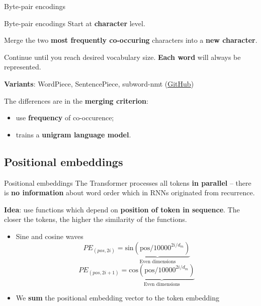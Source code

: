 \documentclass[12pt,aspectratio=169,handout]{beamer}
\begin{document}
\begin{frame}{Byte-pair encodings}

	\begin{block}{Byte-pair encodings}
		Start at \textbf{character} level. 
		
		Merge the two \textbf{most frequently co-occuring} characters into a \textbf{new character}. 
		
		Continue until you reach desired vocabulary size.
		\textbf{Each word} will always be represented.

	\end{block}

	\pause

	\textbf{Variants}: WordPiece, SentencePiece, subword-nmt (\href{https://github.com/google/sentencepiece}{\underline{GitHub}})

	\pause

	The differences are in the \textbf{merging criterion}:
	\pause
	\begin{itemize}
		\item \cite{Sennrich.et.al.2016.ACL} use \textbf{frequency} of co-occurence;
		\item \cite{kudo2018subword} trains a \textbf{unigram language model}.
	\end{itemize}

\end{frame}

\subsection{Positional embeddings}

\begin{frame}{Positional embeddings}
	The Transformer processes all tokens \textbf{in parallel} -- there is \textbf{no information} about word order which in RNNs originated from recurrence. 

	\pause

	\textbf{Idea}: use functions which depend on \textbf{position of token in sequence}. The closer the tokens, the higher the similarity of the functions.
	
	\pause

	\begin{itemize}
		\item Sine and cosine waves
		$$
			PE_{(pos, 2i)} = \underbrace{\text{sin} ( \text{pos} / 10000^{2i / d_m})}_{\text{Even dimensions}}
		$$
		\pause
		$$
			PE_{(pos, 2i+1)} = \underbrace{\text{cos} ( \text{pos} / 10000^{2i / d_m})}_{\text{Even dimensions}}
		$$
		\pause
		\item We \textbf{sum} the positional embedding vector to the token embedding
	\end{itemize}

\end{frame}
\end{document}
